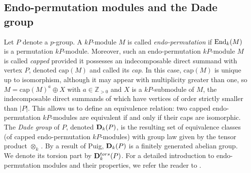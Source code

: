 \vspace{2mm}
\subsection{Endo-permutation modules and the Dade group}\label{subsec:endo-perm}%
Let $P$ denote a $p$-group. A $kP$-module $M$ is called \emph{endo-permutation} if $\operatorname{End}_k(M)$ is a permutation $kP$-module. Moreover, such an endo-permutation $kP$-module $M$ is called \emph{capped} provided it possesses an indecomposable direct summand with vertex $P$, denoted $\mathrm{cap}(M)$ and called its \emph{cap}. In this case, $\mathrm{cap}(M)$ is unique up to isomorphism, although it may appear with multiplicity greater than one, so $M=\mathrm{cap}(M)^a\oplus X$ with $a\in\mathbb{Z}_{>0}$ and $X$ is a $kP$-submodule of $M$, the indecomposable direct summands of which have vertices of order strictly smaller than $|P|$.   
This allows us to define an equivalence relation: two capped endo-permutation $kP$-modules are equivalent if and only if their caps are isomorphic. The \emph{Dade group} of $P$, denoted ${\mathbf{D}}_k(P)$, is the resulting set of equivalence classes (of capped endo-permutation $kP$-modules) with group law given by the tensor product $\otimes_k$\,. By a result of Puig, ${\mathbf{D}}_k(P)$ is a finitely generated abelian group. We denote its torsion part by ${\mathbf{D}}_k^{tors}(P)$. For a detailed introduction to endo-permutation modules and their properties, we refer the reader to \cite{ThevenazSurvey}. \\

